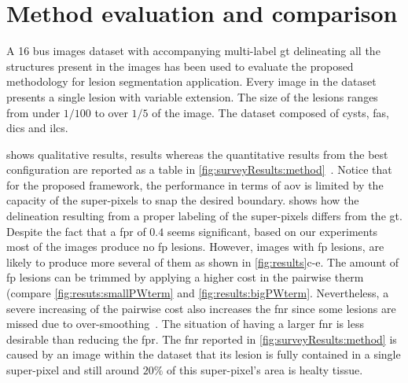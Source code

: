 \graphicspath{ {./content/results/figures/} }



\section{Method evaluation and comparison} 
A 16 \ac{bus} images dataset with accompanying multi-label \ac{gt} delineating all the structures present in the images has been used to evaluate the proposed methodology for lesion segmentation application.
Every image in the dataset presents a single lesion with variable extension. 
The size of the lesions ranges from under $1/100$ to over $1/5$ of the image.
The dataset composed of cysts, \acp{fa}, \acp{dic} and \acp{ilc}.

 shows qualitative results, results whereas the quantitative results from the best configuration are reported as a table in \cref{fig:surveyResults:method}~\cite{massich2013phd}.
Notice that for the proposed framework, the performance in terms of \ac{aov} is limited by the capacity of the super-pixels to snap the desired boundary.
 shows how the delineation resulting from a proper labeling of the super-pixels differs from the \ac{gt}.
Despite the fact that a \ac{fpr} of $0.4$ seems significant, based on our experiments most of the images produce no \ac{fp} lesions.
However, images with \ac{fp} lesions, are likely to produce more several of them as shown in \cref{fig:results}c-e.
The amount of \ac{fp} lesions can be trimmed by applying a higher cost in the pairwise therm (compare \cref{fig:resuts:smallPWterm} and \cref{fig:results:bigPWterm}.
Nevertheless, a severe increasing of the pairwise cost also increases the \ac{fnr} since some lesions are missed due to over-smoothing~\cite{massich2013phd}.
The situation of having a larger \ac{fnr} is less desirable than reducing the \ac{fpr}. 
The \ac{fnr} reported in \cref{fig:surveyResults:method} is caused by an image within the dataset that its lesion is fully contained in a single super-pixel and still around $20\%$ of this super-pixel's area is healty tissue. 

